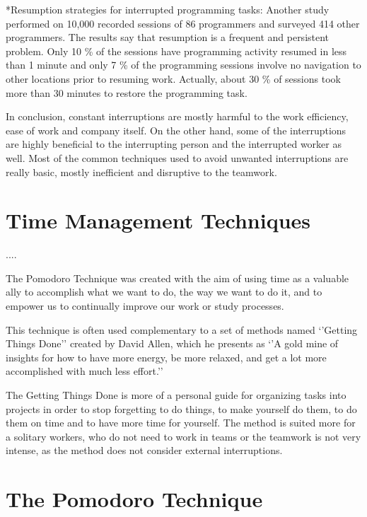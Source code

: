 \documentclass[11pt,singleside]{myfithesis2}
\makeatletter
\renewcommand\paragraph{
   \vspace{-10pt}
   \@startsection{paragraph}{4}{0mm}
      {\baselineskip}
      {- 5pt}
      {\normalfont\normalsize\bfseries}
}
\makeatother
\begin{document}
\paragraph*{Resumption strategies for interrupted programming tasks: } Another study \cite{studyResumptionStrategies} performed on 10,000 recorded sessions of 86 programmers and surveyed 414 other programmers. The results say that resumption is a frequent and persistent problem. Only 10 \% of the sessions have programming activity resumed in less than 1 minute and only 7 \% of the programming sessions involve no navigation to other locations prior to resuming work. Actually, about 30 \% of sessions took more than 30 minutes to restore the programming task.

In conclusion, constant interruptions are mostly harmful to the work efficiency, ease of work and company itself. On the other hand, some of the interruptions are highly beneficial to the interrupting person and the interrupted worker as well. Most of the common techniques used to avoid unwanted interruptions are really basic, mostly inefficient and disruptive to the teamwork.

	\section{Time Management Techniques}

....

The Pomodoro Technique \cite{pomodoro} was created with the aim of using time as a valuable ally to accomplish what we want to do, the way we want to do it, and to empower us to continually improve our work or study processes. 

This technique is often used complementary to a set of methods named `'Getting Things Done'' \cite{gtd} created by David Allen, which he presents as `'A gold mine of insights for how to have more energy, be more relaxed, and get a lot more accomplished with much less effort.''	
	
The Getting Things Done is more of a personal guide for organizing tasks into projects in order to stop forgetting to do things, to make yourself do them, to do them on time and to have more time for yourself. The method is suited more for a solitary workers, who do not need to work in teams or the teamwork is not very intense, as the method does not consider external interruptions.

	\section{The Pomodoro Technique}
\end{document}

